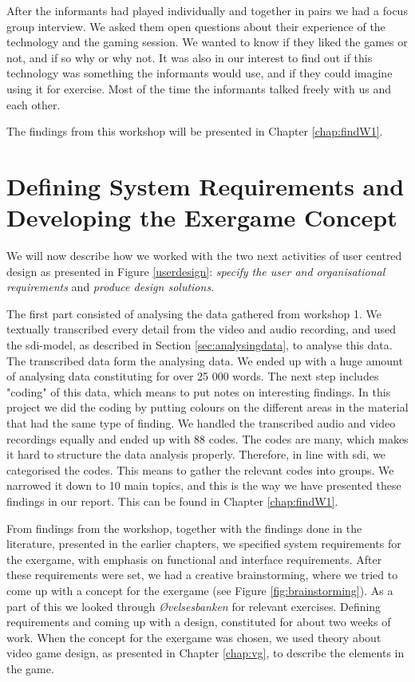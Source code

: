 After the informants had played individually and together in pairs we had a focus group interview. We asked them open questions about their experience of the technology and the gaming session. We wanted to know if they liked the games or not, and if so why or why not. It was also in our interest to find out if this technology was something the informants would use, and if they could imagine using it for exercise. Most of the time the informants talked freely with us and each other.

The findings from this workshop will be presented in Chapter \ref{chap:findW1}.

\section{Defining System Requirements and Developing the Exergame Concept}                
\label{sec:definingconcept}
We will now describe how we worked with the two next activities of user centred design as presented in Figure \ref{userdesign}: \emph{specify the user and organisational requirements} and \emph{produce design solutions}.

The first part consisted of analysing the data gathered from workshop 1. We textually transcribed every detail from the video and audio recording, and used the \ac{sdi}-model, as described in Section \ref{sec:analysingdata}, to analyse this data. The transcribed data form the analysing data. We ended up with a huge amount of analysing data constituting for over 25 000 words. The next step includes "coding" of this data, which means to put notes on interesting findings. In this project we did the coding by putting colours on the different areas in the material that had the same type of finding. We handled the transcribed audio and video recordings equally and ended up with 88 codes.  The codes are many, which makes it hard to structure the data analysis properly. Therefore, in line with \ac{sdi}, we categorised the codes. This means to gather the relevant codes into groups. We narrowed it down to 10 main topics, and this is the way we have presented these findings in our report. This can be found in Chapter \ref{chap:findW1}. 

From findings from the workshop, together with the findings done in the literature, presented in the earlier chapters, we specified system requirements for the exergame, with emphasis on functional and interface requirements. After these requirements were set, we had a creative brainstorming, where we tried to come up with a concept for the exergame (see Figure \ref{fig:brainstorming}). As a part of this we looked through \emph{Øvelsesbanken} \cite{eldretrening} for relevant exercises. Defining requirements and coming up with a design, constituted for about two weeks of work. When the concept for the exergame was chosen, we used theory about video game design, as presented in Chapter \ref{chap:vg}, to describe the elements in the game.

